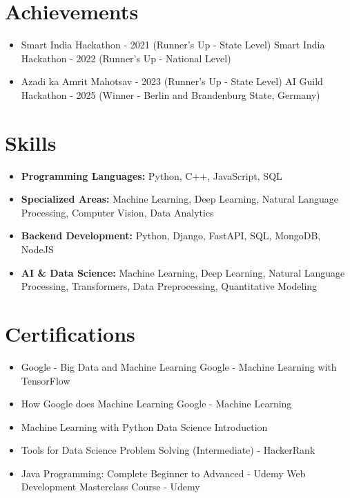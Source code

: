 \documentclass[a4paper,10pt]{article}
\begin{document}
\section*{Achievements}
\begin{itemize}
\item Smart India Hackathon - 2021 (Runner's Up - State Level) \hfill Smart India Hackathon - 2022 (Runner's Up - National Level)
\item Azadi ka Amrit Mahotsav - 2023 (Runner's Up - State Level) \hfill AI Guild Hackathon - 2025 (Winner - Berlin and Brandenburg State, Germany)
\end{itemize}

\section*{Skills}
\begin{itemize}
  \item \textbf{Programming Languages:} Python, C++, JavaScript, SQL
  \item \textbf{Specialized Areas:} Machine Learning, Deep Learning, Natural Language Processing, Computer Vision, Data Analytics
  \item \textbf{Backend Development:} Python, Django, FastAPI, SQL, MongoDB, NodeJS
  \item \textbf{AI \& Data Science:} Machine Learning, Deep Learning, Natural Language Processing, Transformers, Data Preprocessing, Quantitative Modeling
\end{itemize}

\section*{Certifications}
\begin{itemize}
\item Google - Big Data and Machine Learning \hfill Google - Machine Learning with TensorFlow
\item How Google does Machine Learning \hfill Google - Machine Learning
\item Machine Learning with Python \hfill Data Science Introduction
\item Tools for Data Science \hfill Problem Solving (Intermediate) - HackerRank
\item Java Programming: Complete Beginner to Advanced - Udemy \hfill Web Development Masterclass Course - Udemy
\end{itemize}
\end{document}

